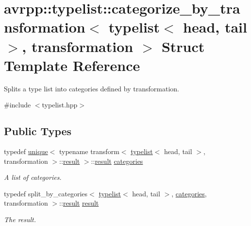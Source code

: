 \hypertarget{structavrpp_1_1typelist_1_1categorize__by__transformation_3_01typelist_3_01head_00_01tail_01_4_00_01transformation_01_4}{
\section{avrpp::typelist::categorize\_\-by\_\-transformation$<$ typelist$<$ head, tail $>$, transformation $>$ Struct Template Reference}
\label{structavrpp_1_1typelist_1_1categorize__by__transformation_3_01typelist_3_01head_00_01tail_01_4_00_01transformation_01_4}
}


Splits a type list into categories defined by transformation.  




{\ttfamily \#include $<$typelist.hpp$>$}

\subsection*{Public Types}
\begin{DoxyCompactItemize}
\item 
typedef \hyperlink{structavrpp_1_1typelist_1_1unique}{unique}$<$ typename transform$<$ \hyperlink{structavrpp_1_1typelist_1_1typelist}{typelist}$<$ head, tail $>$, transformation $>$::\hyperlink{structavrpp_1_1typelist_1_1categorize__by__transformation_3_01typelist_3_01head_00_01tail_01_4_00_01transformation_01_4_a69149872a2c58b86b6a27c470a6e42fa}{result} $>$::\hyperlink{structavrpp_1_1typelist_1_1categorize__by__transformation_3_01typelist_3_01head_00_01tail_01_4_00_01transformation_01_4_a69149872a2c58b86b6a27c470a6e42fa}{result} \hyperlink{structavrpp_1_1typelist_1_1categorize__by__transformation_3_01typelist_3_01head_00_01tail_01_4_00_01transformation_01_4_a545354e092df4e93defb6ef27e514086}{categories}
\begin{DoxyCompactList}\small\item\em A list of categories. \item\end{DoxyCompactList}\item 
typedef split\_\-by\_\-categories$<$ \hyperlink{structavrpp_1_1typelist_1_1typelist}{typelist}$<$ head, tail $>$, \hyperlink{structavrpp_1_1typelist_1_1typelist}{categories}, transformation $>$::\hyperlink{structavrpp_1_1typelist_1_1categorize__by__transformation_3_01typelist_3_01head_00_01tail_01_4_00_01transformation_01_4_a69149872a2c58b86b6a27c470a6e42fa}{result} \hyperlink{structavrpp_1_1typelist_1_1categorize__by__transformation_3_01typelist_3_01head_00_01tail_01_4_00_01transformation_01_4_a69149872a2c58b86b6a27c470a6e42fa}{result}
\begin{DoxyCompactList}\small\item\em The result. \item\end{DoxyCompactList}\end{DoxyCompactItemize}



